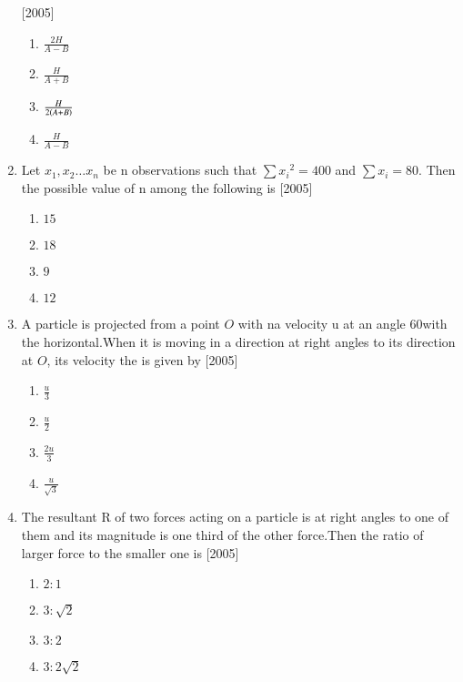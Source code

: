 \documentclass[journal,12pt,twocolumn]{IEEEtran}
\theoremstyle{remark}
\begin{document}
\begin{enumerate}[start=16]
\hfill{[2005]}
\begin{enumerate}
\item $\frac{2H}{A-B}$
\item $\frac{H}{A+B}$
\item $\frac{H}{2\left(A+B\right)}$
\item $\frac{H}{A-B}$
\end{enumerate}
\item Let $x_1,x_2 \dots x_n$ be n observations such that $\sum {x_i}^2 = 400$ and $\sum {x_i} = 80$. Then the possible value of n among the following is
\hfill{[2005]}
\begin{enumerate}
\item $15$
\item $18$
\item $9$
\item $12$
\end{enumerate}
\item A particle is projected from a point $O$ with na velocity u at an angle 60\degree with the horizontal.When it is moving in a direction at right angles to its direction at $O$, its velocity the is given by
\hfill{[2005]}
\begin{enumerate}
\item $\frac{u}{3}$
\item $\frac{u}{2}$
\item $\frac{2u}{3}$
\item $\frac{u}{\sqrt{3}}$
\end{enumerate}
\item The resultant R of two forces acting on a particle is at right angles to one of them and its magnitude is one third of the other force.Then the ratio of larger force to the smaller one is 
\hfill{[2005]}
\begin{enumerate}
\item $ 2\colon 1$
\item $ 3\colon \sqrt{2}$
\item $ 3\colon 2$
\item $ 3\colon 2\sqrt{2}$
\end{enumerate}



\end{enumerate}
\end{document}
